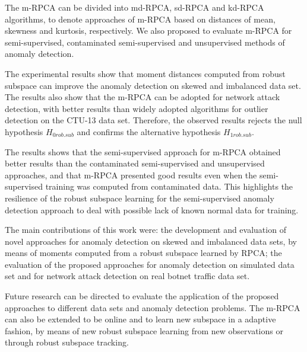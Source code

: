 The m-RPCA can be divided into md-RPCA, sd-RPCA and kd-RPCA algorithms, to denote approaches of m-RPCA based on distances of mean, skewness and kurtosis, respectively. We also proposed to evaluate m-RPCA for semi-supervised, contaminated semi-supervised and unsupervised methods of anomaly detection.

The experimental results show that moment distances computed from robust subspace can improve the anomaly detection on skewed and imbalanced data set. The results also show that the m-RPCA can be adopted for network attack detection, with better results than widely adopted algorithms for outlier detection on the CTU-13 data set. Therefore, the observed results rejects the null hypothesis  $H_{0rob.sub}$ and confirms the alternative
hypothesis $H_{1rob.sub}$.

The results shows that the semi-supervised approach for m-RPCA obtained better results than the contaminated semi-supervised and unsupervised approaches, and that m-RPCA presented good results even when the semi-supervised training was computed from contaminated data. This highlights the resilience of the robust subspace learning for the semi-supervised anomaly detection approach to deal with possible lack of known normal data for training. 

The main contributions of this work were: the development and evaluation of novel approaches for anomaly detection on skewed and imbalanced data sets, by means of moments computed from a robust subspace learned by RPCA; the evaluation of the proposed approaches for anomaly detection on simulated data set and for network attack detection on real botnet traffic data set. 

Future research can be directed to evaluate the application of the proposed approaches to different data sets and anomaly detection problems. The m-RPCA can also be extended to be online and to learn new subspace in a adaptive fashion, by means of new robust subspace learning from new observations or through robust subspace tracking.